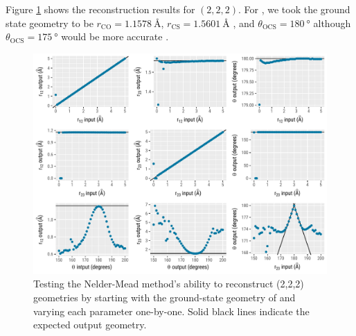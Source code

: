 Figure \ref{fig:OCSSimplexCalibrationPlots} shows the reconstruction results for  $(2,2,2)$. For , we took the ground state geometry to be $r_\mathrm{CO} = \SI{1.1578}{\angstrom}$, $r_\mathrm{CS} = \SI{1.5601}{\angstrom}$ \citep{CRCHandbook88ed}, and $\theta_\mathrm{OCS} = \SI{180}{\degree}$ although $\theta_\mathrm{OCS} = \SI{175}{\degree}$ \citep{Wales12HCI} would be more accurate \citep{Wales12HCI}.

\begin{figure}
  \centering
  \includegraphics[width=\textwidth]{Plots/OCSSimplexCalibrationPlots}
  \caption[Testing the Nelder-Mead method's ability to reconstruct  (2,2,2) geometries.]
  {Testing the Nelder-Mead method's ability to reconstruct  (2,2,2) geometries by starting with the ground-state geometry of  and varying each parameter one-by-one. Solid black lines indicate the expected output geometry.}
  \label{fig:OCSSimplexCalibrationPlots}
\end{figure}


